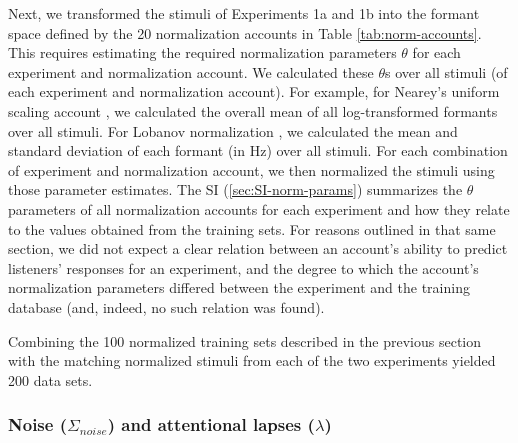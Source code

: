 \documentclass[preprint]{JASA}
\begin{document}
Next, we transformed the stimuli of Experiments 1a and 1b into the formant space defined by the 20 normalization accounts in Table \ref{tab:norm-accounts}. This requires estimating the required normalization parameters \(\theta\) for each experiment and normalization account. We calculated these \(\theta\)s over all stimuli (of each experiment and normalization account). For example, for Nearey's uniform scaling account \citep{nearey1978}, we calculated the overall mean of all log-transformed formants over all stimuli. For Lobanov normalization \citep{lobanov1971}, we calculated the mean and standard deviation of each formant (in Hz) over all stimuli. For each combination of experiment and normalization account, we then normalized the stimuli using those parameter estimates. The SI (\ref{sec:SI-norm-params}) summarizes the \(\theta\) parameters of all normalization accounts for each experiment and how they relate to the values obtained from the training sets. For reasons outlined in that same section, we did not expect a clear relation between an account's ability to predict listeners' responses for an experiment, and the degree to which the account's normalization parameters differed between the experiment and the training database (and, indeed, no such relation was found).

Combining the 100 normalized training sets described in the previous section with the matching normalized stimuli from each of the two experiments yielded 200 data sets.

\subsubsection{\texorpdfstring{Noise (\(\Sigma_{noise}\)) and attentional lapses (\(\lambda\))}{Noise (\textbackslash Sigma\_\{noise\}) and attentional lapses (\textbackslash lambda)}}\label{noise-sigma_noise-and-attentional-lapses-lambda}
\end{document}
